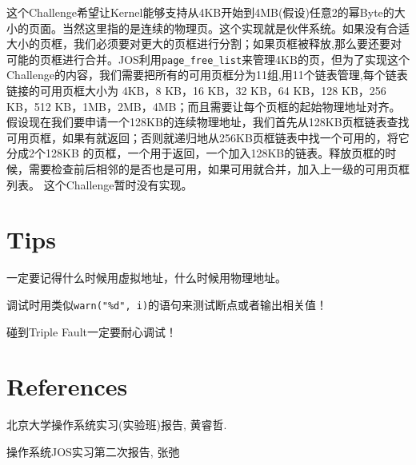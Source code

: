\documentclass[11pt]{article}
\newenvironment{packed_enum}{
\begin{enumerate}
  \setlength{\itemsep}{1pt}
  \setlength{\parskip}{0pt}
  \setlength{\parsep}{0pt}
}{\end{enumerate}}
\begin{document}
这个Challenge希望让Kernel能够支持从4KB开始到4MB(假设)任意2的幂Byte的大小的页面。当然这里指的是连续的物理页。这个实现就是伙伴系统。如果没有合适大小的页框，我们必须要对更大的页框进行分割；如果页框被释放,那么要还要对可能的页框进行合并。JOS利用\lstinline|page_free_list|来管理4KB的页，但为了实现这个Challenge的内容，我们需要把所有的可用页框分为11组,用11个链表管理,每个链表链接的可用页框大小为 4KB，8 KB，16 KB，32 KB，64 KB，128 KB，256 KB，512 KB，1MB，2MB，4MB；而且需要让每个页框的起始物理地址对齐。
假设现在我们要申请一个128KB的连续物理地址，我们首先从128KB页框链表查找可用页框，如果有就返回；否则就递归地从256KB页框链表中找一个可用的，将它分成2个128KB 的页框，一个用于返回，一个加入128KB的链表。释放页框的时候，需要检查前后相邻的是否也是可用，如果可用就合并，加入上一级的可用页框列表。
这个Challenge暂时没有实现。

\section{Tips}
\begin{packed_enum}
\item 一定要记得什么时候用虚拟地址，什么时候用物理地址。
\item 调试时用类似\lstinline|warn("%d", i)|的语句来测试断点或者输出相关值！
\item 碰到Triple Fault一定要耐心调试！
\end{packed_enum}

\section{References}
北京大学操作系统实习(实验班)报告, 黄睿哲.

操作系统JOS实习第二次报告, 张弛
\end{document}
